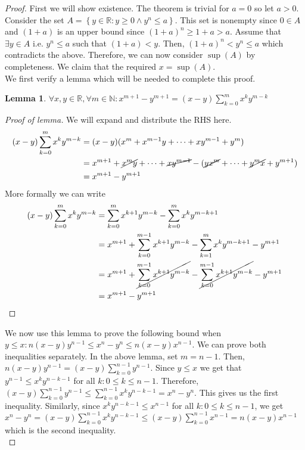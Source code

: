 \documentclass{article}
\newcommand\N{\ensuremath{\mathbb{N}}}
\newcommand\R{\ensuremath{\mathbb{R}}}
\newtheorem{lemma}[theorem]{Lemma}
\theoremstyle{definition}
\theoremstyle{remark}
\theoremstyle{plain}
\begin{document}
\begin{proof}
    First we will show existence. The theorem is trivial for \(a = 0\) so let \(a > 0\).
    Consider the set \(A = \left\{ y \in \R: y \geq 0 \land y^n \leq a \right\}\). This set is nonempty since \(0 \in A\) and 
    \((1+a)\) is an upper bound since \((1+a)^n \geq 1 + a > a\). Assume that \(\exists y \in A\) i.e. \(y^n \leq a\) such that \((1+a) < y\). Then, \((1+a)^n < y^n \leq a\)
    which contradicts the above. Therefore, we can now consider \(\sup(A)\) by completeness. We claim that the required \(x = \sup(A)\).\\

    We first verify a lemma which will be needed to complete this proof. 

    \begin{lemma}
        \(\forall x,y \in \R, \forall m \in \N: x^{m+1} - y^{m+1} = (x-y)\sum\limits_{k = 0}^{m}x^ky^{m-k} \)
    \end{lemma}
    \begin{proof}[Proof of lemma]
        We will expand and distribute the RHS here.
        \begin{align*}
            (x-y)\sum\limits_{k = 0}^{m}x^ky^{m-k} &= (x-y)(x^m + x^{m-1}y + \cdots + xy^{m-1} + y^m)\\
            &= x^{m+1} + \cancel{x^{m}y} +  \cdots + \cancel{xy^{m-1}} - ( \cancel{yx^{m}} + \cdots + \cancel{y^mx} + y^{m+1})\\
            &= x^{m+1} - y^{m+1}\\
        \end{align*}
        More formally we can write 
        \begin{align*}
            (x-y)\sum\limits_{k = 0}^{m}x^ky^{m-k} &= \sum\limits_{k=0}^{m}x^{k+1}y^{m-k} - \sum\limits_{k=0}^{m}x^{k}y^{m-k+1}\\
            &= x^{m+1} + \sum\limits_{k = 0}^{m-1}x^{k+1}y^{m-k} - \sum\limits_{k = 1}^{m}x^ky^{m-k+1} -  y^{m+1}\\
            &= x^{m+1} + \cancel{\sum\limits_{k = 0}^{m-1}x^{k+1}y^{m-k}} - \cancel{\sum\limits_{k = 0}^{m-1}x^{k+1}y^{m-k}} -  y^{m+1}\\
            &= x^{m+1} - y^{m+1}
        \end{align*}
    \end{proof}
    We now use this lemma to prove the following bound when \(y \leq x: n(x-y)y^{n-1} \leq x^n - y^n \leq n(x-y)x^{n-1}\). We can prove both inequalities separately. 
    In the above lemma, set \(m = n - 1\). Then, \(n(x-y)y^{n-1} = (x-y)\sum\limits_{k=0}^{n-1}y^{n-1}\). Since \(y \leq x\) we get that \( y^{n-1} \leq x^{k}y^{n-k-1}\) for all \(k: 0\leq k \leq n-1\). Therefore, 
    \((x-y)\sum\limits_{k=0}^{n-1}y^{n-1} \leq \sum\limits_{k = 0}^{n-1}x^{k}y^{n-k-1} = x^n - y^n\). This gives us the first inequality. Similarly, since \( x^{k}y^{n-k-1} \leq x^{n-1}\) for all \(k: 0\leq k \leq n-1\),
    we get \(x^n - y^n = (x-y)\sum\limits_{k = 0}^{n-1}x^{k}y^{n-k-1} \leq (x-y)\sum\limits_{k=0}^{n-1}x^{n-1} = n(x-y)x^{n-1}\) which is the second inequality.\\


\end{proof}
\end{document}

